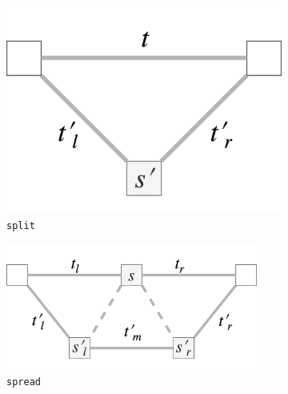 \documentclass[12pt,a4paper,twoside,openany]{report} \usepackage[pdfborder={0 0 0}]{hyperref}    %
\theoremstyle{definition} \newtheorem{definition}{Definition}[section]
\begin{document}
  \begin{figure}[h] \centering 
    \begin{subfigure}[t]{.23\textwidth}
    \centering\includegraphics[keepaspectratio,width=\textwidth]{prep/outer/split} 
    \caption{\texttt{split}}
    \label{fig:splitOp} 
    \end{subfigure} 
    \begin{subfigure}[t]{.38\textwidth}
    \centering\includegraphics[keepaspectratio,width=0.91\textwidth]{prep/outer/spread} 
    \caption{\texttt{spread}}
    \label{fig:spreadOP} 
    \end{subfigure} 
    \begin{subfigure}[t]{.20\textwidth}
    \centering

\end{subfigure}
\end{figure}
\end{document}
